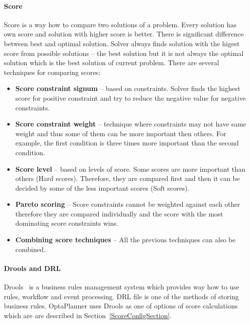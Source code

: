 \paragraph{Score}\label{score}
Score is a way how to compare two solutions of a problem. Every solution has own score and solution with higher score is better. There is significant difference between best and optimal solution. Solver always finds solution with the higest score from possible solutions -- the best solution but it is not always the optimal solution which is the best solution of current problem. There are several techniques for comparing scores:
\begin{itemize}
\item \textbf{Score constraint signum} -- based on constraints. Solver finds the highest score for positive constraint and try to reduce the negative value for negative constraints.
\item \textbf{Score constraint weight} -- technique where constraints may not have same weight and thus some of them can be more important then others. For example, the first condition is three times more important than the second condition.
\item \textbf{Score level} -- based on levels of score. Some scores are more important than others (Hard scores). Therefore, they are compared first and then it can be decided by some of the less important scores (Soft scores).
\item \textbf{Pareto scoring} -- Score constraints cannot be weighted against each other therefore they are compared individually and the score with the most dominating score constraints wins.
\item \textbf{Combining score techniques} -- All the previous techniques can also be combined.
\end{itemize}

\paragraph{Drools and DRL}
Drools~\cite{Drools} is a business rules management system which provides way how to use rules, workflow and event
processing. DRL file is one of the methods of storing business rules. OptaPlanner uses Drools as one of options of score
calculations which are are described in Section~\ref{ScoreConfigSection}.

